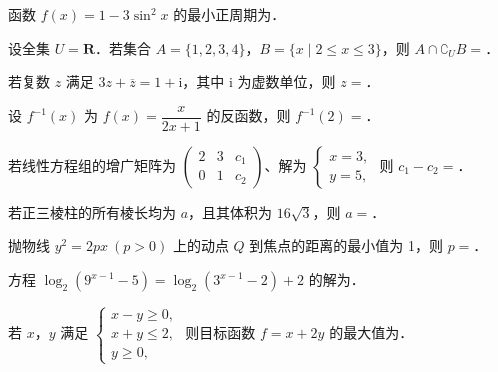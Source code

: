 \begin{question}
函数 \(f(x)=1-3\sin^{2}x\) 的最小正周期为\gkblank{}．

\end{question}
\begin{question}
设全集 \(U=\mathbf{R}\)．若集合 \(A=\{1,2,3,4\}\)，\(B=\{x\mid 2\leqslant x\leqslant 3\}\)，则 \(A\cap\complement_{U}B=\)\gkblank{}．

\end{question}
\begin{question}
若复数 \(z\) 满足 \(3z+\overline{z}=1+\mathrm{i}\)，其中 \(\mathrm{i}\) 为虚数单位，则 \(z=\)\gkblank{}．

\end{question}
\begin{question}
设 \(f^{-1}(x)\) 为 \(f(x)=\dfrac{x}{2x+1}\) 的反函数，则 \(f^{-1}(2)=\)\gkblank{}．

\end{question}
\begin{question}
若线性方程组的增广矩阵为 $\begin{pmatrix} 2 & 3 & c_{1}\\ 0 & 1 & c_{2} \end{pmatrix}$、解为 $\begin{cases} x=3,\\ y=5, \end{cases}$ 则 \(c_{1}-c_{2}=\)\gkblank{}．

\end{question}
\begin{question}
若正三棱柱的所有棱长均为 \(a\)，且其体积为 \(16\sqrt{3}\)，则 \(a=\)\gkblank{}．

\end{question}
\begin{question}
抛物线 \(y^{2}=2px\ (p>0)\) 上的动点 \(Q\) 到焦点的距离的最小值为 1，则 \(p=\)\gkblank{}．

\end{question}
\begin{question}
方程 \(\log_{2}(9^{x-1}-5)=\log_{2}(3^{x-1}-2)+2\) 的解为\gkblank{}．

\end{question}
\begin{question}
若 \(x\)，\(y\) 满足 $\begin{cases} x-y\geqslant 0,\\ x+y\leqslant 2,\\ y\geqslant 0, \end{cases}$ 则目标函数 \(f=x+2y\) 的最大值为\gkblank{}．

\end{question}
